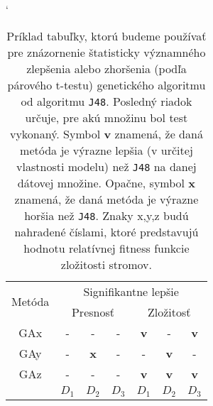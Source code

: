 \begin{table}[h]
\catcode`
\centering 
\newcommand\T{\rule{0pt}{2.6ex}}       %
\newcommand\B{\rule[-1.2ex]{0pt}{0pt}} %
\begin{tabular}{|c||c c c|c c c||}
\hline
\hline \multirow{2}{*}{Metóda} & \multicolumn{6}{c||}{Signifikantne lepšie} 
\\
\cline{2-7} & \multicolumn{3}{c|}{Presnosť} & \multicolumn{3}{c||}{Zložitosť} \\
\hline
\hline
GAx & - & - & - & \textbf{v} & - & \textbf{v} \\ \hline
GAy & - & \textbf{x} & - & - & \textbf{v} & - \\ \hline
GAz & - & - & - & \textbf{v} & \textbf{v} & \textbf{v} \\ \hline
 & $D_1$ & $D_2$ & $D_3$ & $D_1$ & $D_2$ & $D_3$ \\ \hline
\end{tabular}
\caption{Príklad tabuľky, ktorú budeme používať pre znázornenie štatisticky významného zlepšenia alebo zhoršenia (podľa párového t-testu) genetického algoritmu od algoritmu \texttt{J48}. Posledný riadok určuje, pre akú množinu bol test vykonaný. Symbol \textbf{v} znamená, že daná metóda je výrazne lepšia (v určitej vlastnosti modelu) než \texttt{J48} na danej dátovej množine. Opačne, symbol \textbf{x} znamená, že daná metóda je výrazne horšia než \texttt{J48}. Znaky x,y,z budú nahradené číslami, ktoré predstavujú hodnotu relatívnej fitness funkcie zložitosti stromov.}\label{fig:tab3}
\end{table}

